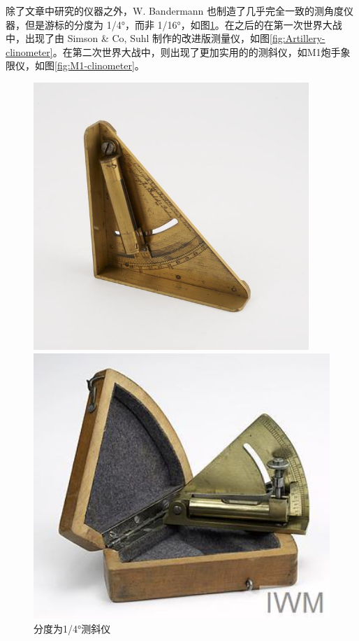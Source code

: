 \documentclass[UTF8]{ctexart}
\begin{document}
除了文章中研究的仪器之外，W. Bandermann 也制造了几乎完全一致的测角度仪器，但是游标的分度为 1/4°，而非 1/16°\cite{Clinometer}，如图\ref{fig:clinometer-1_4}。在之后的在第一次世界大战中，出现了由 Simson \& Co, Suhl 制作的改进版测量仪\cite{Artillery-clinometer}，如图\ref{fig:Artillery-clinometer}。在第二次世界大战中，则出现了更加实用的的测斜仪，如M1炮手象限仪，如图\ref{fig:M1-clinometer}。

\begin{figure}[h]
    \centering
    \begin{minipage}[t]{0.3\textwidth}
        \centering
        \includegraphics[width=0.93\textwidth]{img/clinometer-1_4.jpg}
        \caption{分度为1/4°测斜仪}
        \label{fig:clinometer-1_4}
    \end{minipage}
    \begin{minipage}[t]{0.3\textwidth}
        \centering
        \includegraphics[width=1.0\textwidth]{img/Artillery-clinometer.png}

\end{minipage}
\end{figure}
\end{document}
